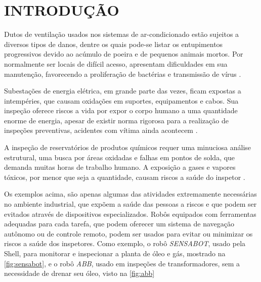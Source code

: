 
\chapter{INTRODUÇÃO}
\label{chap:introducao}

Dutos de ventilação usados nos sistemas de ar-condicionado estão sujeitos a diversos tipos de danos, dentre os quais pode-se listar os entupimentos progressivos devido ao acúmulo de poeira e de pequenos animais mortos.  Por normalmente ser locais de difícil acesso, apresentam dificuldades em sua manutenção, favorecendo a proliferação de bactérias e transmissão de vírus .\par
Subestações de energia elétrica, em grande parte das vezes, ficam expostas a intempéries, que causam oxidações em suportes, equipamentos e cabos. Sua inspeção oferece riscos a vida por expor o corpo humano a uma quantidade enorme de energia, apesar de existir norma rigorosa para a realização de inspeções preventivas, acidentes com vítima ainda acontecem .\par
A inspeção de reservatórios de produtos químicos requer uma minuciosa análise estrutural, uma busca por áreas oxidadas e falhas em pontos de solda, que demanda muitas horas de trabalho humano. A exposição a gases e vapores tóxicos, por menor que seja a quantidade, causam riscos a saúde do inspetor .\par
Os exemplos acima, são apenas algumas das atividades extremamente necessárias no ambiente industrial, que expõem a saúde das pessoas a riscos e que podem ser evitados através de dispositivos especializados. Robôs equipados com ferramentas adequadas para cada tarefa, que podem oferecer um sistema de navegação autônomo ou de controle remoto, podem ser usados para evitar ou minimizar os riscos a saúde dos inspetores. Como exemplo, o robô \textit{SENSABOT}, usado pela Shell, para monitorar e inspecionar a planta de óleo e gás, mostrado na \autoref{fig:sensabot}, e o robô \textit{ABB}, usado em inspeções de transformadores, sem a necessidade de drenar seu óleo, visto na \autoref{fig:abb} \par

